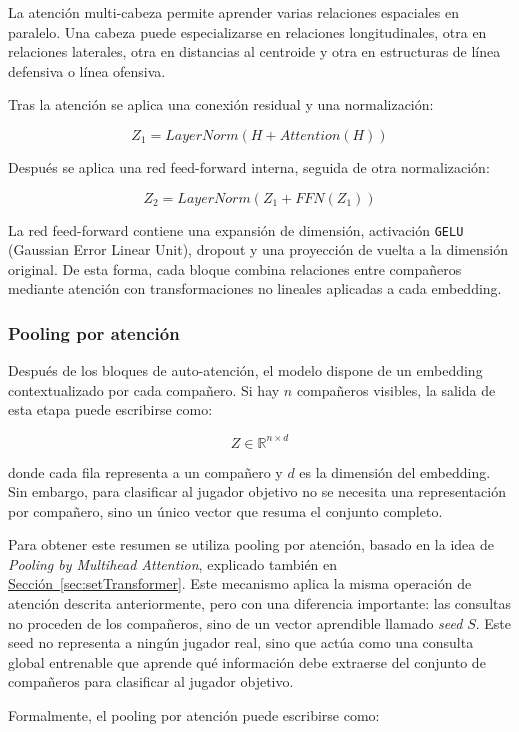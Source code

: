 La atención multi-cabeza permite aprender varias relaciones espaciales en paralelo. Una cabeza puede especializarse en relaciones longitudinales, otra en relaciones laterales, otra en distancias al centroide y otra en estructuras de línea defensiva o línea ofensiva.

Tras la atención se aplica una conexión residual y una normalización:

\[
Z_1 = LayerNorm(H + Attention(H))
\]

Después se aplica una red feed-forward interna, seguida de otra normalización:

\[
Z_2 = LayerNorm(Z_1 + FFN(Z_1))
\]

La red feed-forward contiene una expansión de dimensión, activación \texttt{GELU} (Gaussian Error Linear Unit), dropout y una proyección de vuelta a la dimensión original. De esta forma, cada bloque combina relaciones entre compañeros mediante atención con transformaciones no lineales aplicadas a cada embedding.

\subsubsection{Pooling por atención}

Después de los bloques de auto-atención, el modelo dispone de un embedding contextualizado por cada compañero. Si hay \(n\) compañeros visibles, la salida de esta etapa puede escribirse como:

\[
Z \in \mathbb{R}^{n \times d}
\]

donde cada fila representa a un compañero y \(d\) es la dimensión del embedding. Sin embargo, para clasificar al jugador objetivo no se necesita una representación por compañero, sino un único vector que resuma el conjunto completo.

Para obtener este resumen se utiliza pooling por atención, basado en la idea de \textit{Pooling by Multihead Attention}, explicado también en \hyperref[sec:setTransformer]{Sección~\ref*{sec:setTransformer}}. Este mecanismo aplica la misma operación de atención descrita anteriormente, pero con una diferencia importante: las consultas no proceden de los compañeros, sino de un vector aprendible llamado \textit{seed} $S$. Este seed no representa a ningún jugador real, sino que actúa como una consulta global entrenable que aprende qué información debe extraerse del conjunto de compañeros para clasificar al jugador objetivo.

Formalmente, el pooling por atención puede escribirse como:

